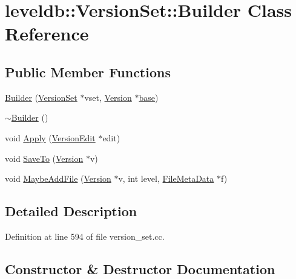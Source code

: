 \hypertarget{classleveldb_1_1_version_set_1_1_builder}{}\section{leveldb\+:\+:Version\+Set\+:\+:Builder Class Reference}
\label{classleveldb_1_1_version_set_1_1_builder}
\subsection*{Public Member Functions}
\begin{DoxyCompactItemize}
\item 
\hyperlink{classleveldb_1_1_version_set_1_1_builder_a19d0dd9aec1b825e7d938e9ac24dc4f7}{Builder} (\hyperlink{classleveldb_1_1_version_set}{Version\+Set} $\ast$vset, \hyperlink{classleveldb_1_1_version}{Version} $\ast$\hyperlink{testharness_8cc_a70ff0f6c026c3dd1ef6aaf504e7fddc3}{base})
\item 
\hyperlink{classleveldb_1_1_version_set_1_1_builder_acd7047ca78d8c654967101f53d10792c}{$\sim$\+Builder} ()
\item 
void \hyperlink{classleveldb_1_1_version_set_1_1_builder_aef505b4363ebc56b8fa5deb55087993f}{Apply} (\hyperlink{classleveldb_1_1_version_edit}{Version\+Edit} $\ast$edit)
\item 
void \hyperlink{classleveldb_1_1_version_set_1_1_builder_a429b23cc022cac08ab2ba880ac5803d1}{Save\+To} (\hyperlink{classleveldb_1_1_version}{Version} $\ast$v)
\item 
void \hyperlink{classleveldb_1_1_version_set_1_1_builder_aa90e0d9d0f8e05b8bcfa879d4f4a88c6}{Maybe\+Add\+File} (\hyperlink{classleveldb_1_1_version}{Version} $\ast$v, int level, \hyperlink{structleveldb_1_1_file_meta_data}{File\+Meta\+Data} $\ast$f)
\end{DoxyCompactItemize}


\subsection{Detailed Description}


Definition at line 594 of file version\+\_\+set.\+cc.



\subsection{Constructor \& Destructor Documentation}
\hypertarget{classleveldb_1_1_version_set_1_1_builder_a19d0dd9aec1b825e7d938e9ac24dc4f7}{}
